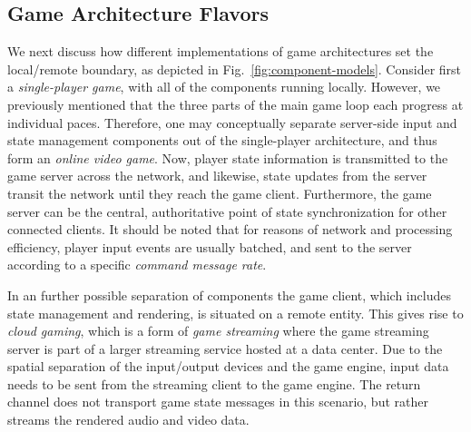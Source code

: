 \subsection{Game Architecture Flavors}

We next discuss how different implementations of game architectures  
set the local/remote boundary, as depicted in Fig.~\ref{fig:component-models}. Consider first a \textit{single-player game}, with all of the 
components running locally. However, we previously mentioned that the 
three parts of the main game loop each progress at individual paces. 
Therefore, one may conceptually separate server-side 
input and state management components out of the single-player 
architecture, and thus form an \textit{online video game}. 
Now, player state information is transmitted to the 
game server across the network, and likewise, state updates from 
the server transit the network until they reach the game client.
Furthermore, the game server can be the central, authoritative 
point of state synchronization for other connected clients.
It should be noted that for reasons of network and processing efficiency, 
player input events are usually batched, and sent to the server according 
to a specific \textit{command message rate}.


In an further possible separation of components the game client, which includes 
state management and rendering, is situated on a remote entity. This gives rise to 
\textit{cloud gaming}, which is a form of \textit{game streaming} 
where the game streaming server is part of a larger streaming service 
hosted at a data center. Due to the spatial separation of the 
input/output devices and the game engine, input data needs to be 
sent from the streaming client to the game engine. The return channel 
does not transport game state messages in this scenario, but rather streams the 
rendered audio and video data.

